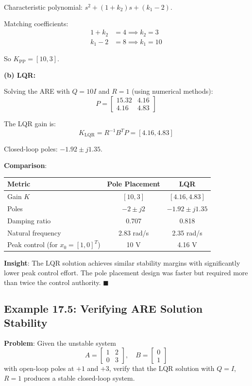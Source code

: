 Characteristic polynomial: $s^2 + (1+k_2)s + (k_1 - 2)$.

Matching coefficients:
\begin{align}
1 + k_2 &= 4 \implies k_2 = 3 \\
k_1 - 2 &= 8 \implies k_1 = 10
\end{align}

So $K_{\text{PP}} = [10, 3]$.

\textbf{(b) LQR:}

Solving the ARE with $Q = 10I$ and $R = 1$ (using numerical methods):
\begin{equation}
P = \begin{bmatrix} 15.32 & 4.16 \\ 4.16 & 4.83 \end{bmatrix}
\end{equation}

The LQR gain is:
\begin{equation}
K_{\text{LQR}} = R^{-1}B^T P = [4.16, 4.83]
\end{equation}

Closed-loop poles: $-1.92 \pm j1.35$.

\textbf{Comparison}:
\begin{table}[H]
\centering
\begin{tabular}{lcc}
\toprule
Metric & Pole Placement & LQR \\
\midrule
Gain $K$ & $[10, 3]$ & $[4.16, 4.83]$ \\
Poles & $-2 \pm j2$ & $-1.92 \pm j1.35$ \\
Damping ratio & 0.707 & 0.818 \\
Natural frequency & 2.83 rad/s & 2.35 rad/s \\
Peak control (for $x_0 = [1,0]^T$) & 10 V & 4.16 V \\
\bottomrule
\end{tabular}
\end{table}

\textbf{Insight}: The LQR solution achieves similar stability margins with significantly lower peak control effort. The pole placement design was faster but required more than twice the control authority. $\blacksquare$

\subsection{Example 17.5: Verifying ARE Solution Stability}

\textbf{Problem}: Given the unstable system
\begin{equation}
A = \begin{bmatrix} 1 & 2 \\ 0 & 3 \end{bmatrix}, \quad B = \begin{bmatrix} 0 \\ 1 \end{bmatrix}
\end{equation}
with open-loop poles at $+1$ and $+3$, verify that the LQR solution with $Q = I$, $R = 1$ produces a stable closed-loop system.

